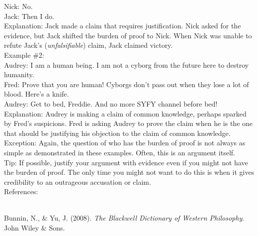 \documentclass[a4paper,12pt,single,pdftex]{scrbook}
\begin{document}
    
      Nick: No.
    \\

    
      Jack: Then I do.
    \\

    
      Explanation: Jack made a claim that requires justification. Nick asked for the evidence, but Jack shifted the burden of proof to Nick. When Nick was unable to refute Jack's ({\it unfalsifiable}) claim, Jack claimed victory.
    \\

    
      Example \#2:
    \\

    
      Audrey: I am a human being. I am not a cyborg from the future here to destroy humanity.
    \\

    
      Fred: Prove that you are human! Cyborgs don't pass out when they lose a lot of blood. Here's a knife.
    \\

    
      Audrey: Get to bed, Freddie. And no more SYFY channel before bed!
    \\

    
      Explanation: Audrey is making a claim of common knowledge, perhaps sparked by Fred's suspicions. Fred is asking Audrey to prove the claim when he is the one that should be justifying his objection to the claim of common knowledge.
    \\

    
      Exception: Again, the question of who has the burden of proof is not always as simple as demonstrated in these examples. Often, this is an argument itself.
    \\

    
      Tip: If possible, justify your argument with evidence even if you might not have the burden of proof. The only time you might not want to do this is when it gives credibility to an outrageous accusation or claim.
    \\

    References:

    
      
        
      \\

      
        
          Bunnin, N., \& Yu, J. (2008). {\it The Blackwell Dictionary of Western Philosophy}. John Wiley \& Sons.
        
      
    
  
\end{document}
